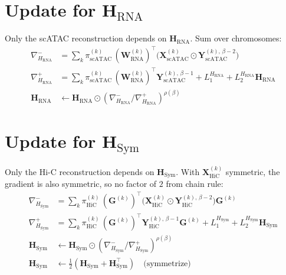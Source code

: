 \documentclass[11pt]{article}
\newcommand{\mat}[1]{\mathbf{#1}}
\newcommand{\Hada}{\odot}
\newcommand{\sci}[1]{\mathrm{#1}}
\begin{document}
\section{Update for $\mat{H}_{\sci{RNA}}$}\label{sec:H_RNA}

Only the scATAC reconstruction depends on $\mat{H}_{\sci{RNA}}$. Sum over chromosomes:
\begin{align}
\nabla^-_{H_{\sci{RNA}}} &= \sum_{k} \pi_{\sci{scATAC}}^{(k)} \, (\mat{W}_{\sci{RNA}}^{(k)})^\top
                              \big( \mat{X}_{\sci{scATAC}}^{(k)} \Hada \mat{Y}_{\sci{scATAC}}^{(k),\,\beta-2} \big) \\
\nabla^+_{H_{\sci{RNA}}} &= \sum_{k} \pi_{\sci{scATAC}}^{(k)} \, (\mat{W}_{\sci{RNA}}^{(k)})^\top
                              \mat{Y}_{\sci{scATAC}}^{(k),\,\beta-1}
                            + L_1^{H_{\sci{RNA}}} + L_2^{H_{\sci{RNA}}} \mat{H}_{\sci{RNA}} \\
\mat{H}_{\sci{RNA}} &\leftarrow \mat{H}_{\sci{RNA}} \Hada
                                 \left( \nabla^-_{H_{\sci{RNA}}} \big/ \nabla^+_{H_{\sci{RNA}}} \right)^{\rho(\beta)}
\end{align}

\section{Update for $\mat{H}_{\sci{Sym}}$}\label{sec:H_Sym}

Only the Hi-C reconstruction depends on $\mat{H}_{\sci{Sym}}$. With $\mat{X}_{\sci{HiC}}^{(k)}$ symmetric, the gradient is also symmetric, so no factor of $2$ from chain rule:
\begin{align}
\nabla^-_{H_{\sci{Sym}}} &= \sum_k \pi_{\sci{HiC}}^{(k)} \,
       (\mat{G}^{(k)})^\top \big( \mat{X}_{\sci{HiC}}^{(k)} \Hada \mat{Y}_{\sci{HiC}}^{(k),\,\beta-2} \big) \mat{G}^{(k)} \\
\nabla^+_{H_{\sci{Sym}}} &= \sum_k \pi_{\sci{HiC}}^{(k)} \,
       (\mat{G}^{(k)})^\top \mat{Y}_{\sci{HiC}}^{(k),\,\beta-1} \mat{G}^{(k)}
   + L_1^{H_{\sci{Sym}}} + L_2^{H_{\sci{Sym}}} \mat{H}_{\sci{Sym}} \\
\mat{H}_{\sci{Sym}} &\leftarrow \mat{H}_{\sci{Sym}} \Hada
                                 \left( \nabla^-_{H_{\sci{Sym}}} \big/ \nabla^+_{H_{\sci{Sym}}} \right)^{\rho(\beta)} \\
\mat{H}_{\sci{Sym}} &\leftarrow \tfrac{1}{2}\left( \mat{H}_{\sci{Sym}} + \mat{H}_{\sci{Sym}}^\top \right)
       \quad\text{(symmetrize)}
\end{align}
\end{document}
